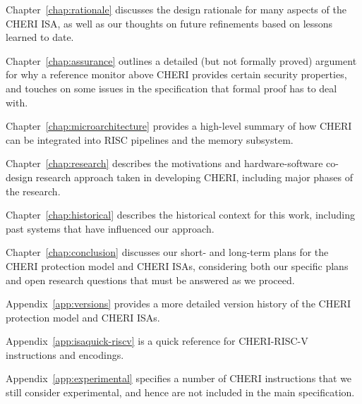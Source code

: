 \medskip
\noindent
Chapter~\ref{chap:rationale} discusses the design rationale for many aspects
of the CHERI ISA, as well as our thoughts on future refinements based on
lessons learned to date.

\medskip
\noindent
Chapter~\ref{chap:assurance} outlines a detailed (but not formally
proved) argument for
why a reference monitor above CHERI provides certain security
properties, and touches on some issues in the specification that
formal proof has to deal with.

\medskip
\noindent
Chapter~\ref{chap:microarchitecture} provides a high-level summary of how
CHERI can be integrated into RISC pipelines and the memory subsystem.

\medskip
\noindent
Chapter~\ref{chap:research} describes the motivations and hardware-software
co-design research approach taken in developing CHERI, including major phases of
the research.

\medskip
\noindent
Chapter~\ref{chap:historical} describes the historical context for this work,
including past systems that have influenced our approach.

\medskip
\noindent
Chapter~\ref{chap:conclusion} discusses our short- and long-term plans for the
CHERI protection model and CHERI ISAs, considering both our specific plans
and open research questions that must be answered as we proceed.

\medskip
\noindent
Appendix~\ref{app:versions} provides a more detailed version history of the
CHERI protection model and CHERI ISAs.

\medskip
\noindent
Appendix~\ref{app:isaquick-riscv} is a quick reference for CHERI-RISC-V
instructions and encodings.

\medskip
\noindent
Appendix~\ref{app:experimental} specifies a number of CHERI instructions
that we still consider experimental, and hence are not included in the main
specification.

